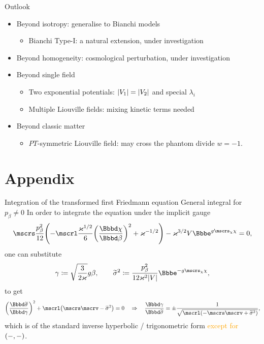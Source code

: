 \documentclass[9pt]{beamer}
\begin{document}
\begin{frame}%
{Outlook}%
\begin{itemize}
\item Beyond isotropy: generalise to Bianchi models
\begin{itemize}
\item Bianchi Type-I: a natural extension, \alert{under investigation}
\end{itemize}

\item Beyond homogeneity: cosmological perturbation,
\alert{under investigation}

\item Beyond single field
\begin{itemize}
\item Two exponential potentials: ${\left|V_1\right|} = {\left|V_2\right|}$ and special 
$\lambda_i$
\item Multiple Liouville fields: mixing kinetic
terms needed
\end{itemize}

\item Beyond classic matter
\begin{itemize}
\item $PT$-symmetric Liouville field: 
may cross the phantom divide $w = -1$.
\end{itemize}

\end{itemize}
\end{frame}


\section*{Appendix}

\begin{frame}%
{Integration of the transformed first Friedmann equation}%
{General integral for $p_\beta \neq 0$}
In order to integrate the equation under the implicit gauge
\begin{align}
\mscrs\frac{p_\beta^2}{12}\rbr{
-\mscrl\frac{\varkappa^{1/2}}{6}\rbr{\frde{\chi}{\beta}}^2
+\varkappa^{-1/2}}
-\varkappa^{3/2}V\ee^{g\mscrs_\chi\chi} = 0,
\end{align}
one can substitute
\begin{align}
\gamma \coloneqq \sqrt{\frac{3}{2\varkappa}}g\beta, \qquad
\widetilde{\sigma}^2 \coloneqq \frac{p_\beta^2}{12\varkappa^2 \vbr{V}}
\ee^{-g\mscrs_\chi\chi},
\end{align}
to get
\begin{align}
\rbr{\frde{\widetilde{\sigma}}{\gamma}}^2
+\mscrl\rbr{\mscrs\mscrv - \widetilde{\sigma}^2} = 0
\quad\Rightarrow\quad
\frde{\gamma}{\widetilde{\sigma}} = \pm
\frac{1}{\sqrt{\mscrl\rbr{- \mscrs\mscrv + \widetilde{\sigma}^2}}},
\end{align}
which is of the standard inverse hyperbolic / trigonometric form
\textcolor{orange}{except for ${\left(-,-\right)}$}.
\end{frame}
\end{document}
